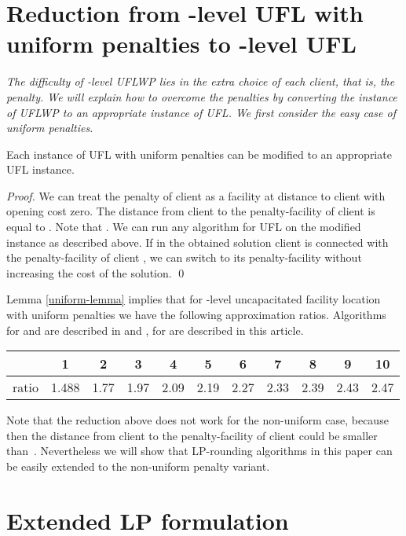 \documentclass{llncs}
\newcommand{\va}[1]{{\color{black}\sl  #1}}
\begin{document}
\section{Reduction from -level UFL with uniform penalties to -level UFL}
\va{The difficulty of -level UFLWP lies in the extra choice of each client, that is, the penalty. 
We will explain how to overcome the penalties by converting the instance of UFLWP to an appropriate instance of UFL. We first consider the easy case of uniform penalties.}
\begin{lemma}
  \label{uniform-lemma}
  Each instance of UFL with uniform penalties can be modified to {an} appropriate UFL instance.
\end{lemma}

\begin{proof}
We can treat the penalty of client  as a facility at distance  to client  with opening cost zero. The distance from client  to the penalty-facility of client  is equal to . Note that . We can run any algorithm for UFL on the modified instance as described above. If in the obtained solution client  is connected with the penalty-facility of client , we can switch  to {its} penalty-facility without increasing the cost of the solution.
\qed
\end{proof}

Lemma \ref{uniform-lemma} implies that for -level uncapacitated facility location with uniform penalties we have the following approximation ratios. Algorithms for  and  are described in \cite{ShiLi} and \cite{Zhang}, for  are described in this article.

\begin{center}
  \begin{tabular}{ c | c | c | c | c | c | c | c | c | c | c }
     & 1 & 2 & 3 & 4 & 5 & 6 & 7 & 8 & 9 & 10 \\ \hline
    ratio & 1.488 & 1.77 & 1.97 & 2.09 & 2.19 & 2.27 &2.33 & 2.39 & 2.43 & 2.47 \\
  \end{tabular}
\end{center}

Note that the reduction above does not work for the non-uniform case, because then the distance from client  to the penalty-facility of client  could be smaller than~.
Nevertheless we will show that LP-rounding algorithms in this paper can be easily extended to the non-uniform penalty variant.

\section{Extended LP formulation}
\end{document}
